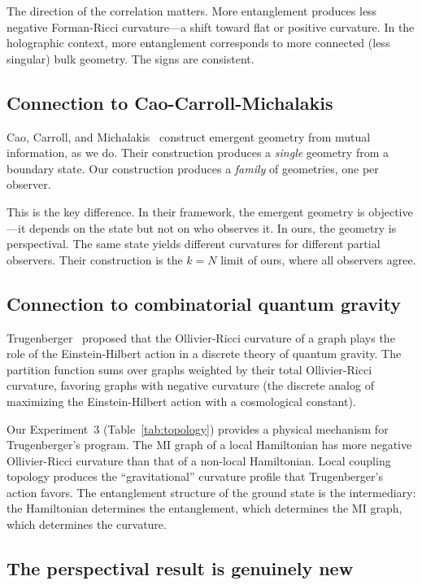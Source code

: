 \documentclass[aps,pra,twocolumn,superscriptaddress]{revtex4-2}
\begin{document}
The direction of the correlation matters. More entanglement produces less negative Forman-Ricci curvature---a shift toward flat or positive curvature. In the holographic context, more entanglement corresponds to more connected (less singular) bulk geometry. The signs are consistent.


\subsection{Connection to Cao-Carroll-Michalakis}

Cao, Carroll, and Michalakis~\cite{cao2017} construct emergent geometry from mutual information, as we do. Their construction produces a \emph{single} geometry from a boundary state. Our construction produces a \emph{family} of geometries, one per observer.

This is the key difference. In their framework, the emergent geometry is objective---it depends on the state but not on who observes it. In ours, the geometry is perspectival. The same state yields different curvatures for different partial observers. Their construction is the $k = N$ limit of ours, where all observers agree.


\subsection{Connection to combinatorial quantum gravity}

Trugenberger~\cite{trugenberger2017} proposed that the Ollivier-Ricci curvature of a graph plays the role of the Einstein-Hilbert action in a discrete theory of quantum gravity. The partition function sums over graphs weighted by their total Ollivier-Ricci curvature, favoring graphs with negative curvature (the discrete analog of maximizing the Einstein-Hilbert action with a cosmological constant).

Our Experiment~3 (Table~\ref{tab:topology}) provides a physical mechanism for Trugenberger's program. The MI graph of a local Hamiltonian has more negative Ollivier-Ricci curvature than that of a non-local Hamiltonian. Local coupling topology produces the ``gravitational'' curvature profile that Trugenberger's action favors. The entanglement structure of the ground state is the intermediary: the Hamiltonian determines the entanglement, which determines the MI graph, which determines the curvature.


\subsection{The perspectival result is genuinely new}
\end{document}
